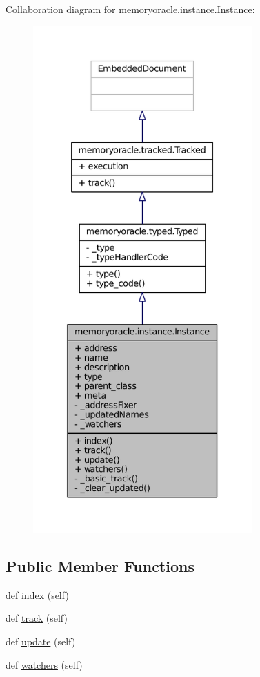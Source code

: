 Collaboration diagram for memoryoracle.\+instance.\+Instance\+:
\nopagebreak
\begin{figure}[H]
\begin{center}
\leavevmode
\includegraphics[height=550pt]{classmemoryoracle_1_1instance_1_1Instance__coll__graph}
\end{center}
\end{figure}
\subsection*{Public Member Functions}
\begin{DoxyCompactItemize}
\item 
def \hyperlink{classmemoryoracle_1_1instance_1_1Instance_a67d649391bded2256ff9a72e2a61143f}{index} (self)
\item 
def \hyperlink{classmemoryoracle_1_1instance_1_1Instance_a86649e01ee4f562debdba5421a334f78}{track} (self)
\item 
def \hyperlink{classmemoryoracle_1_1instance_1_1Instance_a286e015a030541a0704994172024f034}{update} (self)
\item 
def \hyperlink{classmemoryoracle_1_1instance_1_1Instance_a40f0a1608a8472fd2317267db63259be}{watchers} (self)
\end{DoxyCompactItemize}
